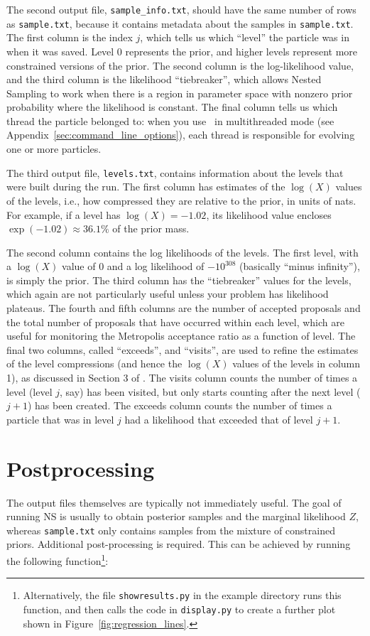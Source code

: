 \documentclass[article, nojss]{jss}
\newcommand{\dnest}{\pkg{DNest4}}
\begin{document}
The second output file, {\tt sample\_info.txt}, should have the same number of
rows as {\tt sample.txt}, because it contains metadata about the samples in
{\tt sample.txt}. The first
column is the index $j$, which tells us which ``level'' the particle was in
when it was saved. Level 0 represents the prior, and higher levels represent
more constrained versions of the prior.
The second column is the log-likelihood value, and the third column is
the likelihood ``tiebreaker'', which allows Nested Sampling to work when
there is a region in parameter space with nonzero prior probability where the
likelihood is constant. The final column tells us which thread the particle
belonged to: when you use \dnest~in multithreaded mode
(see Appendix~\ref{sec:command_line_options}), each thread
is responsible for evolving one or more particles.

The third output file, {\tt levels.txt}, contains information about the levels
that were built during the run. The first column has estimates of the $\log(X)$
values of the levels, i.e., how compressed they are relative to the prior, in
units of nats. For example, if a level has $\log(X) = -1.02$, its likelihood
value encloses $\exp(-1.02) \approx 36.1\%$ of the prior mass.

The second column contains the log likelihoods of the levels.
The first level, with a $\log(X)$ value of 0 and a log likelihood of
$-10^{308}$ (basically ``minus infinity''), is simply the prior. The third
column has the ``tiebreaker'' values for the levels, which again are not
particularly useful unless your problem has likelihood plateaus. The fourth
and fifth columns are the number of accepted proposals and the total number
of proposals that have occurred within each level, which are useful for
monitoring the Metropolis acceptance ratio as a function of level.
The final two columns, called ``exceeds'', and ``visits'', are used to refine
the estimates of the level compressions (and hence the $\log(X)$ values of
the levels in column 1), as discussed in Section 3 of
\citet{brewer2011diffusive}.
The visits column counts the number of times a level (level $j$, say)
has been visited, but only starts counting after the next level ($j+1$) has been created. The exceeds column counts the number of times a particle that was
in level $j$ had a likelihood that exceeded that of level $j+1$.

\section{Postprocessing}\label{sec:postprocessing}
The output files themselves are typically not immediately useful.
The goal of running
NS is usually to obtain posterior samples and the marginal likelihood $Z$,
whereas {\tt sample.txt} only contains samples from the mixture of constrained
priors. Additional
post-processing is required. This can be achieved by running the following
 function\footnote{Alternatively, the file
{\tt showresults.py} in the example directory runs this function, and then
calls the code in {\tt display.py} to create a further plot shown in
Figure~\ref{fig:regression_lines}.}:
\end{document}
